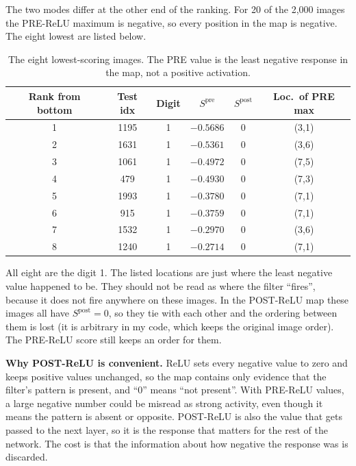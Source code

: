 \documentclass[12pt]{article}
\begin{document}
The two modes differ at the other end of the ranking. For 20 of the 2,000 images the PRE-ReLU maximum is negative, so every position in the map is negative. The eight lowest are listed below.

\begin{table}[H]
\centering
\small
\begin{tabular}{cccccc}
\toprule
Rank from bottom & Test idx & Digit & $S^{\mathrm{pre}}$ & $S^{\mathrm{post}}$ & Loc.\ of PRE max \\
\midrule
1 & 1195 & 1 & $-0.5686$ & 0 & (3,1) \\
2 & 1631 & 1 & $-0.5361$ & 0 & (3,6) \\
3 & 1061 & 1 & $-0.4972$ & 0 & (7,5) \\
4 & 479  & 1 & $-0.4930$ & 0 & (7,3) \\
5 & 1993 & 1 & $-0.3780$ & 0 & (7,1) \\
6 & 915  & 1 & $-0.3759$ & 0 & (7,1) \\
7 & 1532 & 1 & $-0.2970$ & 0 & (3,6) \\
8 & 1240 & 1 & $-0.2714$ & 0 & (7,1) \\
\bottomrule
\end{tabular}
\caption{The eight lowest-scoring images. The PRE value is the least negative response in the map, not a positive activation.}
\end{table}

All eight are the digit 1. The listed locations are just where the least negative value happened to be. They should not be read as where the filter ``fires'', because it does not fire anywhere on these images. In the POST-ReLU map these images all have $S^{\mathrm{post}}=0$, so they tie with each other and the ordering between them is lost (it is arbitrary in my code, which keeps the original image order). The PRE-ReLU score still keeps an order for them.

\textbf{Why POST-ReLU is convenient.} ReLU sets every negative value to zero and keeps positive values unchanged, so the map contains only evidence that the filter's pattern is present, and ``0'' means ``not present''. With PRE-ReLU values, a large negative number could be misread as strong activity, even though it means the pattern is absent or opposite. POST-ReLU is also the value that gets passed to the next layer, so it is the response that matters for the rest of the network. The cost is that the information about how negative the response was is discarded.

\end{document}
